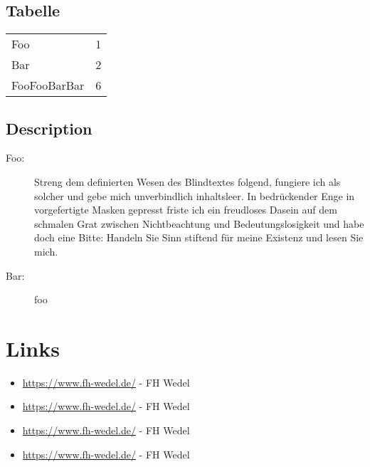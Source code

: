 \documentclass[a4paper,parskip=half,oneside]{scrbook}
\begin{document}
\section{Tabelle}
\begin{tabular}{l r}
Foo  & 1 \\
Bar & 2 \\
FooFooBarBar  & 6 \\
\end{tabular}\section{Description}\begin{description}
    \item [Foo:]  Streng dem definierten Wesen des Blindtextes folgend, fungiere ich als solcher und gebe mich unverbindlich inhaltsleer. In bedrückender Enge in vorgefertigte Masken gepresst friste ich ein freudloses Dasein auf dem schmalen Grat zwischen Nichtbeachtung und Bedeutungslosigkeit und habe doch eine Bitte: Handeln Sie Sinn stiftend für meine Existenz und lesen Sie mich.
    \item [Bar:] foo
  \end{description}


\chapter{Links}

\begin{itemize}
  \item \url{https://www.fh-wedel.de/} - FH Wedel
  \item \url{https://www.fh-wedel.de/} - FH Wedel
  \item \url{https://www.fh-wedel.de/} - FH Wedel
  \item \url{https://www.fh-wedel.de/} - FH Wedel
\end{itemize}
\end{document}
